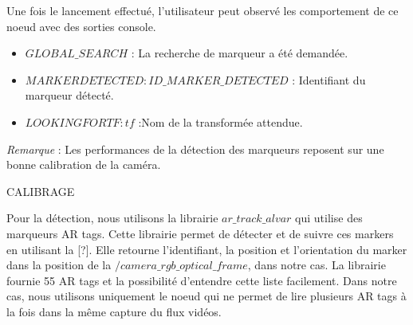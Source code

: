 \documentclass[10pt,a4paper]{article}
\begin{document}
Une fois le lancement effectué, l'utilisateur peut observé les comportement de ce noeud avec des sorties console.
\begin{itemize}
\item $GLOBAL\_SEARCH$ : La recherche de marqueur a été demandée.
\item $ MARKER DETECTED: ID\_MARKER\_DETECTED$ : Identifiant du marqueur détecté.
\item $LOOKING FOR TF: tf$ :Nom de la transformée attendue.\\
\end{itemize}

\textit{Remarque} : Les performances de la détection des marqueurs reposent sur une bonne calibration de la caméra.






CALIBRAGE 

Pour la détection, nous utilisons la librairie $ar\_track\_alvar$ qui utilise des marqueurs AR tags.   
Cette librairie permet de détecter et de suivre ces markers en utilisant la [?]. Elle retourne l'identifiant, la position et l'orientation du marker dans la position de la $/camera\_rgb\_optical\_frame$, dans notre cas. La librairie fournie 55 AR tags et la possibilité d'entendre cette liste facilement. Dans notre cas, nous utilisons uniquement le noeud qui ne permet de lire plusieurs AR tags à la fois dans la même capture du flux vidéos. 
\end{document}

